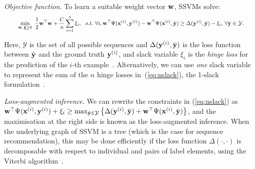 \emph{Objective function}.
To learn a suitable weight vector $\mathbf{w}$, SSVMs solve: %
\begin{equation}
\label{eq:nslack}
\resizebox{0.93\linewidth}{!}{$\displaystyle
\begin{aligned}
\min_{\w, \, \bm{\xi} \ge 0} ~\frac{1}{2} \w^\top \w + \frac{C}{n} \sum_{i=1}^n \xi_i,  ~~s.t.~  \forall i, 
  \w^\top \Psi(\x^{(i)}, \y^{(i)}) - \w^\top \Psi(\x^{(i)}, \bar{\y}) \ge
  \Delta(\y^{(i)}, \bar{\y}) - \xi_i, \, \forall \bar\y \in \mathcal{Y}.
\end{aligned}
$} \eqmoveup
\end{equation}

Here, 
$\mathcal{Y}$ is the set of all possible sequences
and $\Delta(\mathbf{y}^{({i})}, \bar{\mathbf{y}})$ is the loss function between $\bar{\mathbf{y}}$ and the ground truth $\mathbf{y}^{({i})}$,
and slack variable $\xi_i$ is the \emph{hinge loss} for the prediction of the $i$-th example~\cite{tsochantaridis2005large}.
Alternatively, we can use \emph{one} slack variable to represent the sum of the $n$ hinge losses in~(\ref{eq:nslack}), 
\ie the 1-slack formulation~\cite{tsochantaridis2005large}.


\emph{Loss-augmented inference}.
We can rewrite the constraints in (\ref{eq:nslack}) as 
$\mathbf{w}^\top \Psi(\mathbf{x}^{({i})}, \mathbf{y}^{({i})}) + \xi_i \ge 
\max_{\bar{\mathbf{y}} \in \mathcal{Y}} \left\{ \Delta(\mathbf{y}^{({i})}, \bar{\mathbf{y}}) + \mathbf{w}^\top \Psi(\mathbf{x}^{({i})}, \bar{\mathbf{y}}) \right\}$,
and the maximisation at the right side is known as the loss-augmented inference.
When the underlying graph of SSVM is a tree (which is the case for sequence recommendation),
this may be done efficiently if the loss function $\Delta(\cdot,\cdot)$ is decomposable
with respect to individual and pairs of label elements,
\eg using the Viterbi algorithm~\cite{joachims2009predicting}.

